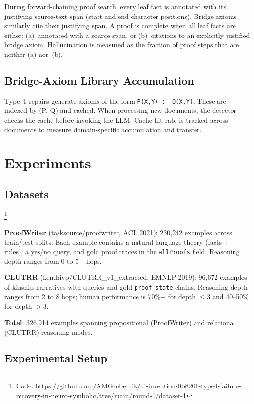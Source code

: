 \documentclass[11pt,letterpaper]{article}
\begin{document}
During forward-chaining proof search, every leaf fact is annotated with its justifying source-text span (start and end character positions). Bridge axioms similarly cite their justifying span. A proof is complete when all leaf facts are either: (a)~annotated with a source span, or (b)~citations to an explicitly justified bridge axiom. Hallucination is measured as the fraction of proof steps that are neither (a) nor~(b).

\subsection{Bridge-Axiom Library Accumulation}

Type~1 repairs generate axioms of the form \texttt{P(X,Y) :- Q(X,Y)}. These are indexed by (P, Q) and cached. When processing new documents, the detector checks the cache before invoking the LLM. Cache hit rate is tracked across documents to measure domain-specific accumulation and transfer.

\section{Experiments}
\label{sec:experiments}

\subsection{Datasets}
\footnote{Code: \url{https://github.com/AMGrobelnik/ai-invention-0b8201-typed-failure-recovery-in-neuro-symbolic/tree/main/round-1/dataset-1}}

\textbf{ProofWriter} \citep{Tafjord2021} (tasksource/proofwriter, ACL 2021): 230,242 examples across train/test splits. Each example contains a natural-language theory (facts + rules), a yes/no query, and gold proof traces in the \texttt{allProofs} field. Reasoning depth ranges from 0 to 5+ hops.

\textbf{CLUTRR} \citep{Sinha2019} (kendrivp/CLUTRR\_v1\_extracted, EMNLP 2019): 96,672 examples of kinship narratives with queries and gold \texttt{proof\_state} chains. Reasoning depth ranges from 2 to 8 hops; human performance is 70\%+ for depth $\leq 3$ and 40--50\% for depth $> 3$.

\textbf{Total}: 326,914 examples spanning propositional (ProofWriter) and relational (CLUTRR) reasoning modes.

\subsection{Experimental Setup}
\end{document}

